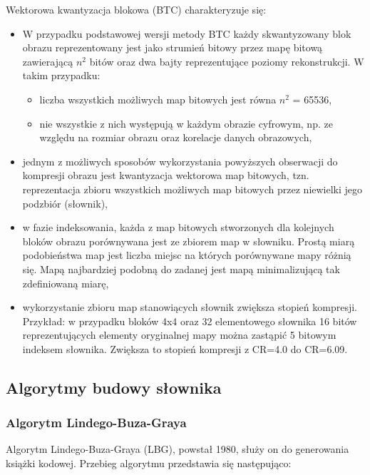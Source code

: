 \documentclass{article}
\begin{document}
Wektorowa kwantyzacja blokowa (BTC) charakteryzuje się:

\begin{itemize} 
  \item W przypadku podstawowej wersji metody BTC każdy skwantyzowany blok obrazu reprezentowany jest jako strumień
        bitowy przez mapę bitową zawierającą $n^{2}$ bitów oraz dwa bajty reprezentujące poziomy rekonstrukcji. W takim przypadku:
        \begin{itemize}
          \item liczba wszystkich możliwych map bitowych jest równa $n^{2}$ = 65536,
          \item nie wszystkie z nich występują w każdym obrazie cyfrowym, np. ze względu na rozmiar obrazu oraz korelacje danych obrazowych,
        \end{itemize}
  \item jednym z możliwych sposobów wykorzystania powyższych obserwacji do kompresji obrazu jest
        kwantyzacja wektorowa map bitowych, tzn. reprezentacja zbioru wszystkich możliwych map bitowych przez niewielki jego podzbiór (słownik),
  \item w fazie indeksowania, każda z map bitowych stworzonych dla kolejnych bloków obrazu porównywana jest ze zbiorem map w słowniku.
        Prostą miarą podobieństwa map jest liczba miejsc na których porównywane mapy różnią się. 
        Mapą najbardziej podobną do zadanej jest mapą minimalizującą tak zdefiniowaną miarę,
  \item wykorzystanie zbioru map stanowiących słownik zwiększa stopień kompresji.
        Przykład: w przypadku bloków 4x4 oraz 32 elementowego słownika 16 bitów reprezentujących 
        elementy oryginalnej mapy można zastąpić 5 bitowym indeksem słownika. Zwiększa to stopień kompresji z CR=4.0 do CR=6.09.
\end{itemize}

\subsection{Algorytmy budowy słownika}

\subsubsection{Algorytm Lindego-Buza-Graya}

Algorytm Lindego-Buza-Graya (LBG), powstał 1980, służy on do generowania książki kodowej. Przebieg algorytmu przedstawia się następująco:
\end{document}
